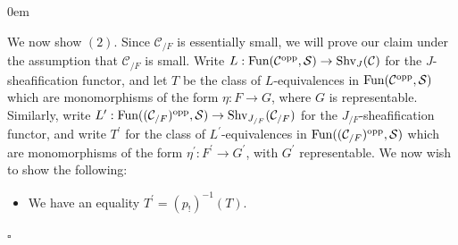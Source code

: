 \documentclass[10pt]{article}
\newcommand{\mS}{\mathcal S}
\newcommand{\C}{\mathcal C}
\renewcommand{\qed}{\hfill$\square$}
\renewenvironment{proof}{\begin{addmargin}[1em]{0em}\begin{newproof}}{\end{newproof}\end{addmargin}\qed}
\theoremstyle{witharg}
\theoremstyle{witharg}
\theoremstyle{witharg2}
\begin{document}
\begin{proof}
We now show $(2)$. Since $\C_{/F}$ is essentially small, we will prove our claim under the assumption that $\C_{/F}$ is small. Write $L:\textnormal{Fun}(\C^{\textnormal{opp}},\mS)\rightarrow \textnormal{Shv}_J(\C)$ for the $J$-sheafification functor, and let $T$ be the class of $L$-equivalences in $\textnormal{Fun}(\C^{\textnormal{opp}},\mS)$ which are monomorphisms of the form $\eta:F\rightarrow G$, where $G$ is representable. Similarly, write $L^\prime:\textnormal{Fun}((\C_{/F})^{\textnormal{opp}},\mS)\rightarrow \textnormal{Shv}_{J_{/F}}(\C_{/F})$ for the $J_{/F}$-sheafification functor, and write $T^\prime$ for the class of $L^\prime$-equivalences in $\textnormal{Fun}((\C_{/F})^{\textnormal{opp}},\mS)$ which are monomorphisms of the form $\eta^\prime:F^\prime\rightarrow G^\prime$, with $G^\prime$ representable. We now wish to show the following:

\begin{itemize}

    \item [$(*)$] We have an equality $T^\prime=(p_!)^{-1}(T)$. 

\end{itemize}


\end{proof}
\end{document}
